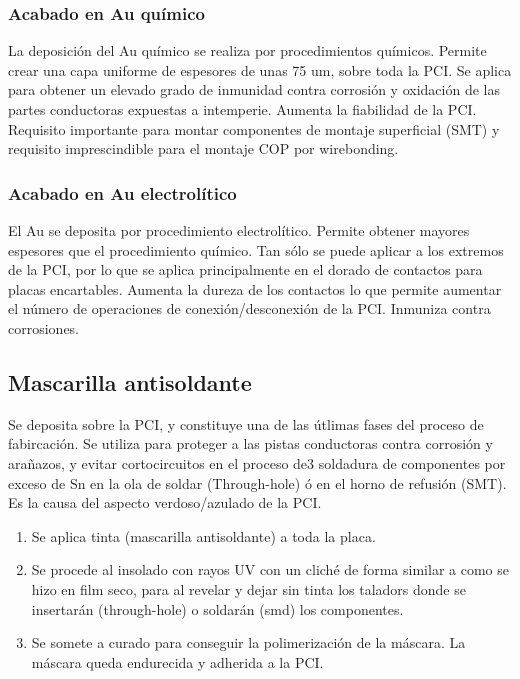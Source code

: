 \subsubsection{Acabado en Au químico}
La deposición del Au químico se realiza por procedimientos químicos. Permite crear una capa uniforme de espesores de unas 75 um, sobre toda la PCI. Se aplica para obtener un elevado grado de inmunidad contra corrosión y oxidación de las partes conductoras expuestas a intemperie. Aumenta la fiabilidad de la PCI. Requisito importante para montar componentes de montaje superficial (SMT) y requisito imprescindible para el montaje COP por wirebonding.

\subsubsection{Acabado en Au electrolítico}
El Au se deposita por procedimiento electrolítico. Permite obtener mayores espesores que el procedimiento químico. Tan sólo se puede aplicar a los extremos de la PCI, por lo que se aplica principalmente en el dorado de contactos para placas encartables. Aumenta la dureza de los contactos lo que permite aumentar el número de operaciones de conexión/desconexión de la PCI. Inmuniza contra corrosiones.

\subsection{Mascarilla antisoldante}
Se deposita sobre la PCI, y constituye una de las útlimas fases del proceso de fabircación. Se utiliza para proteger a las pistas conductoras contra corrosión y arañazos, y evitar cortocircuitos en el proceso de3 soldadura de componentes por exceso de Sn en la ola de soldar (Through-hole) ó en el horno de refusión (SMT). Es la causa del aspecto verdoso/azulado de la PCI.

\begin{enumerate}
    \item Se aplica tinta (mascarilla antisoldante) a toda la placa.
    \item Se procede al insolado con rayos UV con un cliché de forma similar a como se hizo en film seco, para al revelar y dejar sin tinta los taladors donde se insertarán (through-hole) o soldarán (smd) los componentes.
    \item Se somete a curado para conseguir la polimerización de la máscara. La máscara queda endurecida y adherida a la PCI.
\end{enumerate}

